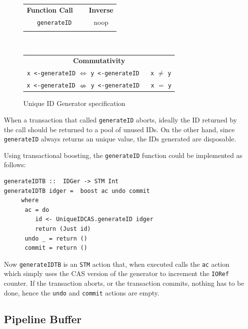 \documentclass{llncs}
\newcommand{\spc}{\quad \!\!\!\!}
\begin{document}
\begin{figure}[!ht]
\begin{center}
{\small\begin{tabular}{ c c }
  {\bf Function Call} $\spc$ &  {\bf Inverse}  \\
  {\tt generateID}  & noop \\
&\\
\end{tabular}\\
\begin{tabular}{ c }
  {\bf Commutativity}  \\
  {\tt x <-generateID} $\Leftrightarrow$ {\tt y <-generateID} $\spc$ {\tt x} $\neq$ {\tt y}\\
  {\tt x <-generateID} $\nLeftrightarrow$ {\tt y <-generateID} $\spc$ {\tt x} $=$ {\tt y}\\
\end{tabular}}
\end{center}
\caption{Unique ID Generator specification}
\label{fig:idgenerator}
\end{figure}

When a transaction that called {\tt generateID} aborts, ideally the ID returned by
the call should be returned to a pool of unused IDs. On the other hand, since
{\tt generateID} always returns an unique value, the IDs generated are disposable.

Using transactional boosting, the {\tt generateID} function could be implemented as follows:

{\small\begin{verbatim}
generateIDTB ::  IDGer -> STM Int
generateIDTB idger =  boost ac undo commit
     where
      ac = do
         id <- UniqueIDCAS.generateID idger
         return (Just id)
      undo _ = return ()
      commit = return () 
\end{verbatim}}

Now {\tt generateIDTB} is an {\tt STM} action that, when executed calls the {\tt ac}
action which simply uses the CAS version of the generator to increment the {\tt IORef} counter.
If the transaction aborts, or the transaction commits, nothing has to be done, hence
the {\tt undo} and {\tt commit} actions are empty.

\subsection{Pipeline Buffer}
\label{sec:pipeline}
\end{document}
